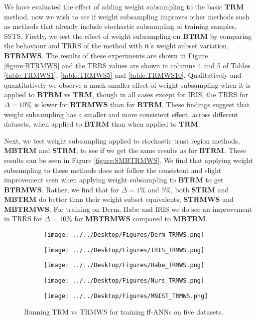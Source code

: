 \documentclass[letterpaper,12pt,titlepage,oneside,final]{book}
\begin{document}
		We have evaluated the effect of adding weight subsampling to the basic $\mathbf{TRM}$ method, now we wish to see if weight subsampling improves other methods such as methods that already include stochastic subsampling of training samples, SSTS. Firstly, we test the effect of weight subsampling on $\mathbf{BTRM}$ by comparing the behaviour and TRRS of the method with it's weight subset variation, $\mathbf{BTRMWS}$. The results of these experiments are shown in Figure \ref{figure:BTRMWS} and the TRRS values are shown in columns 4 and 5 of Tables \ref{table:TRMWS1}, \ref{table:TRMWS5} and \ref{table:TRMWS10}. Qualitatively and quantitatively we observe a much smaller effect of weight subsampling when it is applied to $\mathbf{BTRM}$ vs $\mathbf{TRM}$, though in all cases except for IRIS, the TRRS for $\Delta=10\%$ is lower for $\mathbf{BTRMWS}$ than for $\mathbf{BTRM}$. These findings suggest that weight subsampling has a smaller and more consistent effect, across different datasets, when applied to $\mathbf{BTRM}$ than when applied to $\mathbf{TRM}$. 
	
	Next, we test weight subsampling applied to stochastic trust region methods, \textbf{MBTRM} and \textbf{STRM}, to see if we get the same results as for $\mathbf{BTRM}$. These results can be seen in Figure \ref{figure:SMBTRMWS}. We find that applying weight subsampling to these methods does not follow the consistent and slight improvement seen when applying weight subsampling to $\mathbf{BTRM}$ to get $\mathbf{BTRMWS}$. Rather, we find that for $\Delta=1 \%$ and $5\%$, both \textbf{STRM} and \textbf{MBTRM} do better than their weight subset equivalents, \textbf{STRMWS} and \textbf{MBTRMWS}. For training on Derm, Habe and IRIS we do see an improvement in TRRS for $\Delta=10\%$ for $\mathbf{MBTRMWS}$ compared to \textbf{MBTRM}. 
	
	\begin{figure}
		\centering
		\begin{subfigure}{.45\textwidth}
			\texttt{[image: ../../Desktop/Figures/Derm\_TRMWS.png]}
		\end{subfigure}
		\begin{subfigure}{.45\textwidth}
			\texttt{[image: ../../Desktop/Figures/IRIS\_TRMWS.png]}
		\end{subfigure}
		\begin{subfigure}{.45\textwidth}
			\texttt{[image: ../../Desktop/Figures/Habe\_TRMWS.png]}
		\end{subfigure}
		\begin{subfigure}{.45\textwidth}
			\texttt{[image: ../../Desktop/Figures/Nurs\_TRMWS.png]}
		\end{subfigure}
		\begin{subfigure}{.45\textwidth}
			\texttt{[image: ../../Desktop/Figures/MNIST\_TRMWS.png]}
		\end{subfigure}
		\caption{Running TRM vs TRMWS for training ff-ANNs on five datasets.}
		\label{figure:TRMWS}
	\end{figure}
	
\end{document}
